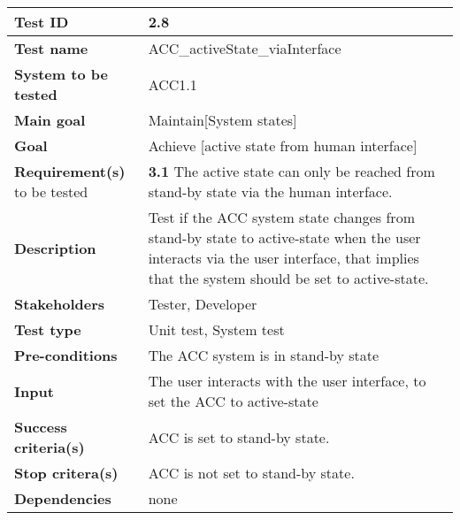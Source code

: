 \begin{table}[H]
		\begin{tabular}{| p{4cm} | p{10cm} |}
			\hline
			\rowcolor{gray}
			{\bf Test ID} & 2.8 \\ \hline
			{\bf Test name} & ACC\_activeState\_viaInterface\\ \hline
			{\bf System to be tested} & ACC1.1\\ \hline
			{\bf Main goal} & Maintain[System states]\\ \hline
			{\bf Goal} & Achieve [active state  from human interface] \\ \hline
			{\bf Requirement(s)} to be tested & {\bf 3.1} The active state can only be 
			reached from stand-by state via the human interface. \\ \hline
			{\bf Description} & Test if the ACC system state changes from stand-by state 
			to active-state when the user interacts via the user interface, that implies 
			that the system should be set to active-state. \\ \hline
			{\bf Stakeholders} & Tester, Developer \\ \hline
			{\bf Test type} & Unit test, System test \\ \hline
			{\bf Pre-conditions} & The ACC system is in stand-by state \\ \hline
			{\bf Input} & The user interacts with the user interface, to set the ACC to 
			active-state \\ \hline
			{\bf Success criteria(s)} & ACC is set to stand-by state. \\ \hline
			{\bf Stop critera(s)} & ACC is not set to stand-by state. \\ \hline
			{\bf Dependencies} & none \\ \hline
		\end{tabular}
	\end{table}

